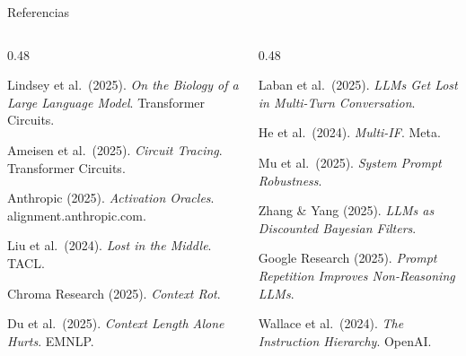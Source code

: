 \documentclass[aspectratio=169, 12pt]{beamer}
\begin{document}
\begin{frame}{Referencias}

\scriptsize
\begin{columns}[T]
\begin{column}{0.48\textwidth}

Lindsey et al.\ (2025). \emph{On the Biology of a Large Language Model}. Transformer Circuits.\par\medskip
Ameisen et al.\ (2025). \emph{Circuit Tracing}. Transformer Circuits.\par\medskip
Anthropic (2025). \emph{Activation Oracles}. alignment.anthropic.com.\par\medskip
Liu et al.\ (2024). \emph{Lost in the Middle}. TACL.\par\medskip
Chroma Research (2025). \emph{Context Rot}.\par\medskip
Du et al.\ (2025). \emph{Context Length Alone Hurts}. EMNLP.\par

\end{column}

\begin{column}{0.48\textwidth}

Laban et al.\ (2025). \emph{LLMs Get Lost in Multi-Turn Conversation}.\par\medskip
He et al.\ (2024). \emph{Multi-IF}. Meta.\par\medskip
Mu et al.\ (2025). \emph{System Prompt Robustness}.\par\medskip
Zhang \& Yang (2025). \emph{LLMs as Discounted Bayesian Filters}.\par\medskip
Google Research (2025). \emph{Prompt Repetition Improves Non-Reasoning LLMs}.\par\medskip
Wallace et al.\ (2024). \emph{The Instruction Hierarchy}. OpenAI.\par

\end{column}
\end{columns}

\end{frame}
\end{document}
